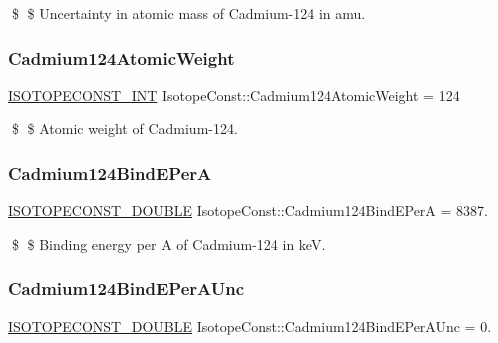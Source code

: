 \$ \$ Uncertainty in atomic mass of Cadmium-\/124 in amu. \mbox{\label{group___isotope_const-_cadmium-_cd124_ga7c1d1c6f36aba07ed7b25632bab4e9bb}} 
\subsubsection{\texorpdfstring{Cadmium124\+Atomic\+Weight}{Cadmium124AtomicWeight}}
{\footnotesize\ttfamily \mbox{\hyperlink{group___isotope_const-_macros_ga5f18360b3e99483a35c32d789e62621c}{I\+S\+O\+T\+O\+P\+E\+C\+O\+N\+S\+T\+\_\+\+I\+NT}} Isotope\+Const\+::\+Cadmium124\+Atomic\+Weight = 124}

\$ \$ Atomic weight of Cadmium-\/124. \mbox{\label{group___isotope_const-_cadmium-_cd124_ga403130d2270804fac908b5a2e02adb1c}} 
\subsubsection{\texorpdfstring{Cadmium124\+Bind\+E\+PerA}{Cadmium124BindEPerA}}
{\footnotesize\ttfamily \mbox{\hyperlink{group___isotope_const-_macros_ga8f45a7272ce02c0b4c65c44636ed719a}{I\+S\+O\+T\+O\+P\+E\+C\+O\+N\+S\+T\+\_\+\+D\+O\+U\+B\+LE}} Isotope\+Const\+::\+Cadmium124\+Bind\+E\+PerA = 8387.}

\$ \$ Binding energy per A of Cadmium-\/124 in keV. \mbox{\label{group___isotope_const-_cadmium-_cd124_ga8065e24eabbd6f2d9108d68a94b3faee}} 
\subsubsection{\texorpdfstring{Cadmium124\+Bind\+E\+Per\+A\+Unc}{Cadmium124BindEPerAUnc}}
{\footnotesize\ttfamily \mbox{\hyperlink{group___isotope_const-_macros_ga8f45a7272ce02c0b4c65c44636ed719a}{I\+S\+O\+T\+O\+P\+E\+C\+O\+N\+S\+T\+\_\+\+D\+O\+U\+B\+LE}} Isotope\+Const\+::\+Cadmium124\+Bind\+E\+Per\+A\+Unc = 0.}

